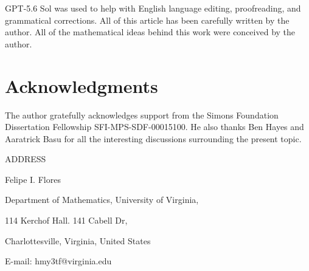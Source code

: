 \documentclass[11pt]{article}
\theoremstyle{definition}
\theoremstyle{remark}
\numberwithin{equation}{section}
\numberwithin{equation}{section}
\numberwithin{equation}{section}
\begin{document}
GPT-5.6 Sol was used to help with English language editing, proofreading, and grammatical corrections. All of this article has been carefully written by the author. All of the mathematical ideas behind this work were conceived by the author. 




\section*{Acknowledgments}

The author gratefully acknowledges support from the Simons Foundation Dissertation Fellowship SFI-MPS-SDF-00015100. He also thanks Ben Hayes and Aaratrick Basu for all the interesting discussions surrounding the present topic. 




\printbibliography
\newpage

\bigskip
\bigskip
ADDRESS



\smallskip
\smallskip
Felipe I. Flores

Department of Mathematics, University of Virginia,

114 Kerchof Hall. 141 Cabell Dr,

Charlottesville, Virginia, United States

E-mail: hmy3tf@virginia.edu
\end{document}
